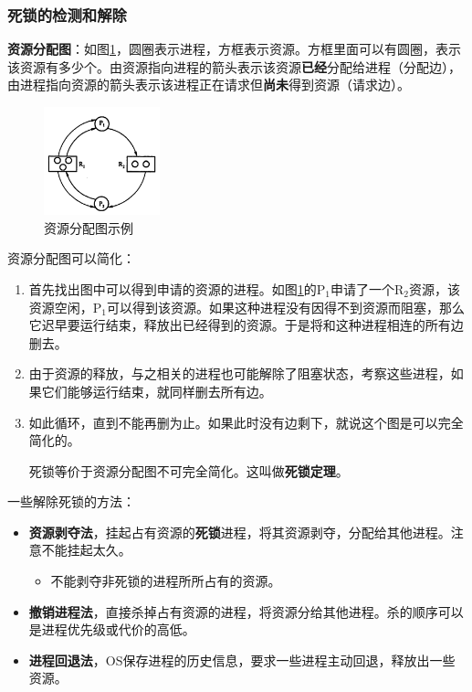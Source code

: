 \documentclass[12pt, a4paper, oneside]{ctexart}
\begin{document}
\subsubsection{死锁的检测和解除}

\textbf{资源分配图}：如图\ref{resource_allocation_graph}，圆圈表示进程，方框表示资源。方框里面可以有圆圈，表示该资源有多少个。由资源指向进程的箭头表示该资源\textbf{已经}分配给进程（分配边），由进程指向资源的箭头表示该进程正在请求但\textbf{尚未}得到资源（请求边）。

\begin{figure}
  \centering
  \includegraphics[width=0.3\textwidth]{./images/resource_allocation_graph.png}
  \caption{资源分配图示例}
  \label{resource_allocation_graph}
\end{figure}

资源分配图可以简化：
\begin{enumerate}
  \item 首先找出图中可以得到申请的资源的进程。如图\ref{resource_allocation_graph}的P$_1$申请了一个R$_2$资源，该资源空闲，P$_1$可以得到该资源。如果这种进程没有因得不到资源而阻塞，那么它迟早要运行结束，释放出已经得到的资源。于是将和这种进程相连的所有边删去。
  \item 由于资源的释放，与之相关的进程也可能解除了阻塞状态，考察这些进程，如果它们能够运行结束，就同样删去所有边。
  \item 如此循环，直到不能再删为止。如果此时没有边剩下，就说这个图是可以完全简化的。
  
  死锁等价于资源分配图不可完全简化。这叫做\textbf{死锁定理}。
\end{enumerate}

一些解除死锁的方法：
\begin{itemize}
  \item {\bf 资源剥夺法}，挂起占有资源的\textbf{死锁}进程，将其资源剥夺，分配给其他进程。注意不能挂起太久。
  \begin{itemize}
    \item 不能剥夺非死锁的进程所所占有的资源。
  \end{itemize}
  \item {\bf 撤销进程法}，直接杀掉占有资源的进程，将资源分给其他进程。杀的顺序可以是进程优先级或代价的高低。
  \item {\bf 进程回退法}，OS保存进程的历史信息，要求一些进程主动回退，释放出一些资源。
\end{itemize}
\end{document}

